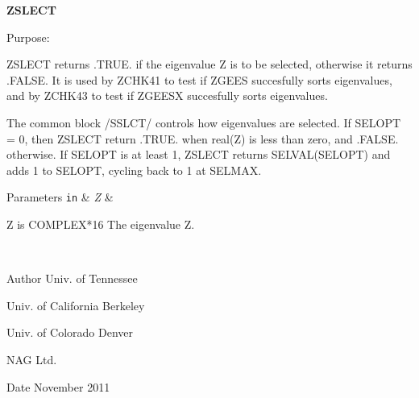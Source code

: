 {\bfseries Z\+S\+L\+E\+C\+T} 

\begin{DoxyParagraph}{Purpose\+: }
\begin{DoxyVerb} ZSLECT returns .TRUE. if the eigenvalue Z is to be selected,
 otherwise it returns .FALSE.
 It is used by ZCHK41 to test if ZGEES succesfully sorts eigenvalues,
 and by ZCHK43 to test if ZGEESX succesfully sorts eigenvalues.

 The common block /SSLCT/ controls how eigenvalues are selected.
 If SELOPT = 0, then ZSLECT return .TRUE. when real(Z) is less than
 zero, and .FALSE. otherwise.
 If SELOPT is at least 1, ZSLECT returns SELVAL(SELOPT) and adds 1
 to SELOPT, cycling back to 1 at SELMAX.\end{DoxyVerb}
 
\end{DoxyParagraph}

\begin{DoxyParams}[1]{Parameters}
\mbox{\tt in}  & {\em Z} & \begin{DoxyVerb}          Z is COMPLEX*16
          The eigenvalue Z.\end{DoxyVerb}
 \\
\hline
\end{DoxyParams}
\begin{DoxyAuthor}{Author}
Univ. of Tennessee 

Univ. of California Berkeley 

Univ. of Colorado Denver 

N\+A\+G Ltd. 
\end{DoxyAuthor}
\begin{DoxyDate}{Date}
November 2011 
\end{DoxyDate}
\hypertarget{group__complex16__eig_ga648d5fcaa302d5769d588aaa6f736fe8}{}
